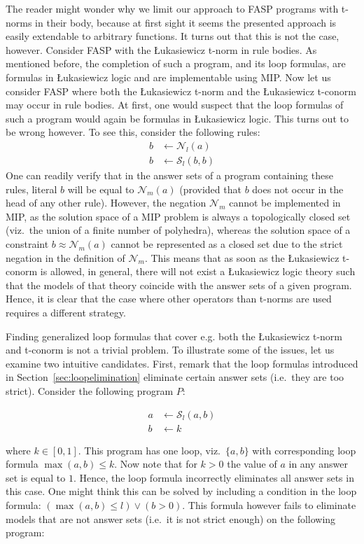 \documentclass{tlp}
\newcommand{\fneg}[2]{\ensuremath{\mathcal{N}_{#1}(#2)}}
\newcommand{\lneg}[1]{\fneg{l}{#1}}
\newcommand{\mneg}[1]{\fneg{m}{#1}}
\newcommand{\feq}{\ensuremath{\approx}}
\newcommand{\pretconorm}{\mathcal{S}}
\begin{document}
The reader might wonder why we limit our approach to FASP programs with t-norms in their body, because at first sight it
seems the presented approach is easily extendable to arbitrary functions. It turns out that this is not the case,
however. Consider FASP with the \L ukasiewicz t-norm in rule bodies. As mentioned before, the completion of such a program, and its loop formulas, are formulas in \L ukasiewicz logic and are implementable using MIP. Now let us consider FASP where both the \L ukasiewicz t-norm and the \L ukasiewicz t-conorm may occur in rule bodies. At first, one would suspect that the loop formulas of such a program would again be formulas in \L ukasiewicz logic.
This turns out to be wrong however. To see this, consider the following rules:
 \begin{align*}
  b &\gets \lneg{a}\\
  b &\gets \pretconorm_l(b,b)
 \end{align*}
One can readily verify that in the answer sets of a program containing these rules, literal $b$ will be equal to $\mneg{a}$ (provided that $b$ does not occur in the head of any other rule). 
However, the negation $\mathcal{N}_m$ cannot be implemented in MIP, as the solution space of a MIP problem is always a topologically closed set (viz.~the union of a finite number of polyhedra), whereas the solution space of a constraint $b \feq \mneg{a}$ cannot be represented as a closed set due to the strict negation in the definition of $\mathcal{N}_m$. This means that as soon as the \L ukasiewicz t-conorm is allowed, in general, there will not exist a \L ukasiewicz logic theory such that the models of that theory coincide with the answer sets of a given program. Hence, it is clear that the case where other operators than t-norms are used requires a different strategy.

Finding generalized loop formulas that cover e.g. both the \L ukasiewicz t-norm and t-conorm is not a trivial problem.  To illustrate some of the issues, let us examine two intuitive candidates. First, remark that the loop formulas introduced in Section~\ref{sec:loopelimination} eliminate certain answer sets (i.e.~they are too strict). Consider the following program $P$:

\begin{align*}
 a &\gets \pretconorm_l(a,b)\\
 b &\gets k
\end{align*}

\noindent where $k \in [0,1]$. This program has one loop, viz.~$\{a,b\}$ with corresponding loop formula $\max(a,b) \leq k$.
Now note that for $k > 0$ the value of $a$ in any answer set is equal to $1$. Hence, the loop formula incorrectly eliminates all answer sets in this case. One might think this can be solved by including a condition in the loop formula: $(\max(a,b) \leq l) \vee (b > 0)$. This formula however fails to eliminate models that are not answer sets (i.e.~it is not strict enough) on the following program:
\end{document}
